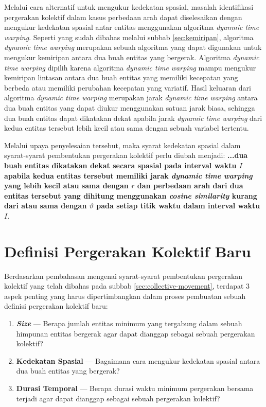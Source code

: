 Melalui cara alternatif untuk mengukur kedekatan spasial, masalah identifikasi pergerakan kolektif dalam kasus perbedaan arah dapat diselesaikan dengan mengukur kedekatan spasial antar entitas menggunakan algoritma \textit{dyanmic time warping}. Seperti yang sudah dibahas melalui subbab \ref{sec:kemiripan}, algoritma \textit{dynamic time warping} merupakan sebuah algoritma yang dapat digunakan untuk mengukur kemiripan antara dua buah entitas yang bergerak. Algoritma \textit{dynamic time warping} dipilih karena algoritma \textit{dynamic time warping} mampu mengukur kemiripan lintasan antara dua buah entitas yang memiliki kecepatan yang berbeda atau memiliki perubahan kecepatan yang variatif. Hasil keluaran dari algoritma \textit{dynamic time warping} merupakan jarak \textit{dynamic time warping} antara dua buah entitas yang dapat diukur menggunakan satuan jarak biasa, sehingga dua buah entitas dapat dikatakan dekat apabila jarak \textit{dynamic time warping} dari kedua entitas tersebut lebih kecil atau sama dengan sebuah variabel tertentu.

Melalui upaya penyelesaian tersebut, maka syarat kedekatan spasial dalam syarat-syarat pembentukan pergerakan kolektif perlu diubah menjadi: \textbf{...dua buah entitas dikatakan dekat secara spasial pada interval waktu $I$ apabila kedua entitas tersebut memiliki jarak \textit{dynamic time warping} yang lebih kecil atau sama dengan $r$ dan perbedaan arah dari dua entitas tersebut yang dihitung menggunakan \textit{cosine similarity} kurang dari atau sama dengan $\vartheta$ pada setiap titik waktu dalam interval waktu $I$}.

\section{Definisi Pergerakan Kolektif Baru}

Berdasarkan pembahasan mengenai syarat-syarat pembentukan pergerakan kolektif yang telah dibahas pada subbab \ref{sec:collective-movement}, terdapat 3 aspek penting yang harus dipertimbangkan dalam proses pembuatan sebuah definisi pergerakan kolektif baru:

\begin{enumerate}
    \item \textbf{\textit{Size}} --- Berapa jumlah entitas minimum yang tergabung dalam sebuah himpunan entitas bergerak agar dapat dianggap sebagai sebuah pergerakan kolektif?
    \item \textbf{Kedekatan Spasial} --- Bagaimana cara mengukur kedekatan spasial antara dua buah entitas yang bergerak?
    \item \textbf{Durasi Temporal} --- Berapa durasi waktu minimum pergerakan bersama terjadi agar dapat dianggap sebagai sebuah pergerakan kolektif?
\end{enumerate}


